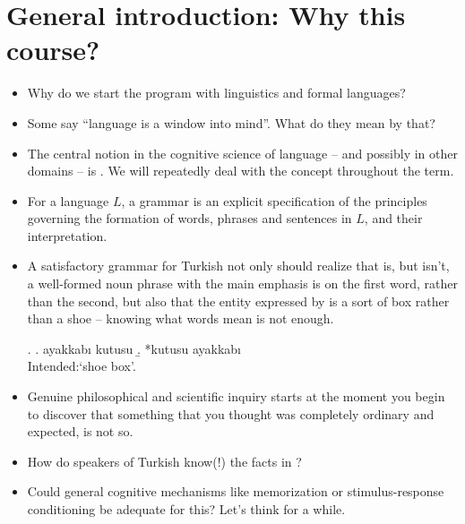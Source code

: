 \documentclass[11pt]{article}
\begin{document}
\section*{General introduction: Why this course?}

\begin{itemize}
\item Why do we start the program with linguistics and formal languages?
	
\item Some say ``language is a window into mind''. What do they mean by that? 
\end{itemize}

\begin{itemize}
\item The central notion in the cognitive science of language -- and possibly
in other domains -- is . We will repeatedly deal with the concept
throughout the term.
\item For a language $L$, a grammar is an explicit specification of the principles governing the
formation of words, phrases and sentences in $L$, and their interpretation.
\item A satisfactory grammar for Turkish not only should realize that 
 is, but   isn't, a well-formed noun phrase
with the main emphasis is on the first word, rather than the second,
but also that the entity expressed by  is a sort of box rather
than a shoe -- knowing what words mean is not enough.


\ex.\label{akutusu}
\a. ayakkabı kutusu
\b. *kutusu ayakkabı\\
	Intended:`shoe box'.

\item Genuine philosophical and scientific inquiry starts at the moment you
begin to discover that something that you thought was completely ordinary and
expected, is not so. 

\item How do speakers of Turkish know(!) the facts in ?

\item Could general cognitive mechanisms like memorization or stimulus-response conditioning be adequate for this? Let's think for a while.
\end{itemize}
\end{document}
